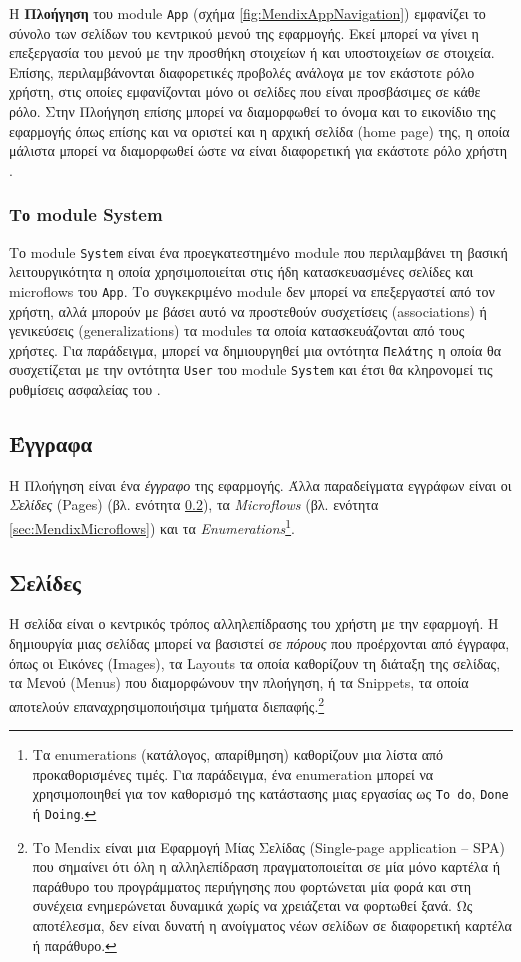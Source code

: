             Η \textbf{Πλοήγηση} του module \texttt{App} (σχήμα \ref{fig:MendixAppNavigation}) εμφανίζει το σύνολο των σελίδων του κεντρικού μενού της εφαρμογής. Εκεί μπορεί να γίνει η επεξεργασία του μενού με την προσθήκη στοιχείων ή και υποστοιχείων σε στοιχεία. Επίσης, περιλαμβάνονται διαφορετικές προβολές ανάλογα με τον εκάστοτε ρόλο χρήστη, στις οποίες εμφανίζονται μόνο οι σελίδες που είναι προσβάσιμες σε κάθε ρόλο. Στην Πλοήγηση επίσης μπορεί να διαμορφωθεί το όνομα και το εικονίδιο της εφαρμογής όπως επίσης και να οριστεί και η αρχική σελίδα (home page) της, η οποία μάλιστα μπορεί να διαμορφωθεί ώστε να είναι διαφορετική για εκάστοτε ρόλο χρήστη \cite{mendixDoc}.

            \subsubsection{Το module System}
                Το module \texttt{System} είναι ένα προεγκατεστημένο module που περιλαμβάνει τη βασική λειτουργικότητα η οποία χρησιμοποιείται στις ήδη κατασκευασμένες σελίδες και microflows του \texttt{App}. Το συγκεκριμένο module δεν μπορεί να επεξεργαστεί από τον χρήστη, αλλά μπορούν με βάσει αυτό να προστεθούν συσχετίσεις (associations) ή γενικεύσεις (generalizations) τα modules τα οποία κατασκευάζονται από τους χρήστες. Για παράδειγμα, μπορεί να δημιουργηθεί μια οντότητα \texttt{Πελάτης} η οποία θα συσχετίζεται με την οντότητα \texttt{User} του module \texttt{System} και έτσι θα κληρονομεί τις ρυθμίσεις ασφαλείας του \cite{mendixSystemModule}.

        \subsection{Έγγραφα}
            Η Πλοήγηση είναι ένα \textit{έγγραφο} της εφαρμογής. Άλλα παραδείγματα εγγράφων είναι οι \textit{Σελίδες} (Pages) (βλ. ενότητα \ref{sec:MendixPages}), τα \textit{Microflows} (βλ. ενότητα \ref{sec:MendixMicroflows}) και τα \textit{Enumerations}\footnote{Τα enumerations (κατάλογος, απαρίθμηση) καθορίζουν μια λίστα από προκαθορισμένες τιμές. Για παράδειγμα, ένα enumeration μπορεί να χρησιμοποιηθεί για τον καθορισμό της κατάστασης μιας εργασίας ως \texttt{To do}, \texttt{Done} ή \texttt{Doing}.}.

        \subsection{Σελίδες} \label{sec:MendixPages}
            Η σελίδα είναι ο κεντρικός τρόπος αλληλεπίδρασης του χρήστη με την εφαρμογή. Η δημιουργία μιας σελίδας μπορεί να βασιστεί σε \textit{πόρους} που προέρχονται από έγγραφα, όπως οι Εικόνες (Images), τα Layouts τα οποία καθορίζουν τη διάταξη της σελίδας, τα Μενού (Menus) που διαμορφώνουν την πλοήγηση, ή τα Snippets, τα οποία αποτελούν επαναχρησιμοποιήσιμα τμήματα διεπαφής.\footnote{Το Mendix είναι μια Εφαρμογή Μίας Σελίδας (Single-page application -- SPA) που σημαίνει ότι όλη η αλληλεπίδραση πραγματοποιείται σε μία μόνο καρτέλα ή παράθυρο του προγράμματος περιήγησης που φορτώνεται μία φορά και στη συνέχεια ενημερώνεται δυναμικά χωρίς να χρειάζεται να φορτωθεί ξανά. Ως αποτέλεσμα, δεν είναι δυνατή η ανοίγματος νέων σελίδων σε διαφορετική καρτέλα ή παράθυρο.}

